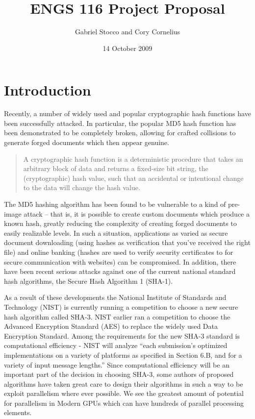 \documentclass{article}
\title{ENGS 116 Project Proposal}
\author{Gabriel Stocco and Cory Cornelius}
\date{14 October 2009}
\begin{document}
\maketitle

\section*{Introduction}
Recently, a number of widely used and popular cryptographic hash functions have been successfully attacked.  In particular, the popular MD5 hash function has been demonstrated to be completely broken, allowing for crafted collisions to generate forged documents which then appear genuine.\cite{Nostradamus}

\begin{quotation}A cryptographic hash function is a deterministic procedure that takes an arbitrary block of data and returns a fixed-size bit string, the (cryptographic) hash value, such that an accidental or intentional change to the data will change the hash value.\cite{HashDef}
\end{quotation}

The MD5 hashing algorithm has been found to be vulnerable to a kind of pre-image attack -- that is, it is possible to create custom documents which produce a known hash, greatly reducing the complexity of creating forged documents to easily realizable levels.
In such a situation, applications as varied as secure document downloading (using hashes as verification that you've received the right file) and online banking (hashes are used to verify security certificates to for secure communication with websites) can be compromised.
In addition, there have been recent serious attacks against one of the current national standard hash algorithms, the Secure Hash Algorithm 1 (SHA-1).\cite{Sha1Collisions}

As a result of these developments the National Institute of Standards and Technology (NIST) is currently running a competition to choose a new secure hash algorithm called SHA-3.\cite{Sha3Request}
NIST earlier ran a competition to choose the Advanced Encryption Standard (AES) to replace the widely used Data Encryption Standard.
Among the requirements for the new SHA-3 standard is computational efficiency - NIST will analyze ``each submission’s optimized implementations on a variety of platforms as specified in Section 6.B, and for a variety of input message lengths.''\cite{Sha3Request}
Since computational efficiency will be an important part of the decision in choosing SHA-3, some authors of proposed algorithms have taken great care to design their algorithms in such a way to be exploit parallelism where ever possible.
We see the greatest amount of potential for parallelism in Modern GPUs which can have hundreds of parallel processing elements.
\end{document}

